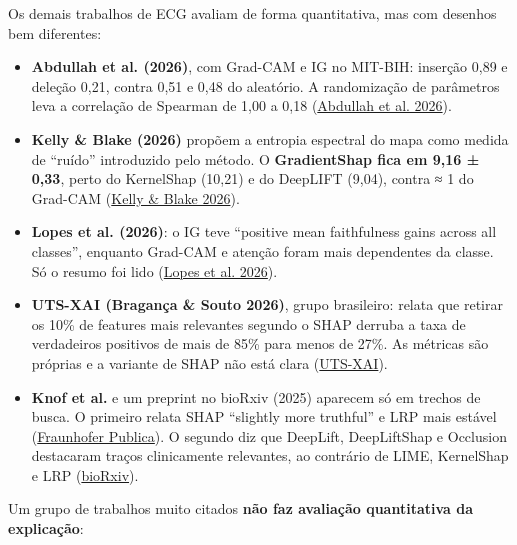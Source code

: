 \documentclass[11pt,a4paper]{article}
\begin{document}
Os demais trabalhos de ECG avaliam de forma quantitativa, mas com desenhos bem diferentes:

\begin{itemize}
\item \textbf{Abdullah et al. (2026)}, com Grad-CAM e IG no MIT-BIH: inserção 0,89 e deleção 0,21, contra 0,51 e 0,48 do aleatório. A randomização de parâmetros leva a correlação de Spearman de 1,00 a 0,18 (\href{https://pmc.ncbi.nlm.nih.gov/articles/PMC13296925/}{Abdullah et al. 2026}).
\item \textbf{Kelly \& Blake (2026)} propõem a entropia espectral do mapa como medida de ``ruído'' introduzido pelo método. O \textbf{GradientShap fica em 9,16 ± 0,33}, perto do KernelShap (10,21) e do DeepLIFT (9,04), contra ≈ 1 do Grad-CAM (\href{https://arxiv.org/html/2606.24974}{Kelly \& Blake 2026}).
\item \textbf{Lopes et al. (2026)}: o IG teve ``positive mean faithfulness gains across all classes'', enquanto Grad-CAM e atenção foram mais dependentes da classe. Só o resumo foi lido (\href{https://recima21.com.br/recima21/en/article/view/9152}{Lopes et al. 2026}).
\item \textbf{UTS-XAI (Bragança \& Souto 2026)}, grupo brasileiro: relata que retirar os 10\% de features mais relevantes segundo o SHAP derruba a taxa de verdadeiros positivos de mais de 85\% para menos de 27\%. As métricas são próprias e a variante de SHAP não está clara (\href{https://pmc.ncbi.nlm.nih.gov/articles/PMC13369486/}{UTS-XAI}).
\item \textbf{Knof et al.} e um preprint no bioRxiv (2025) aparecem só em trechos de busca. O primeiro relata SHAP ``slightly more truthful'' e LRP mais estável (\href{https://publica.fraunhofer.de/handle/publica/472815}{Fraunhofer Publica}). O segundo diz que DeepLift, DeepLiftShap e Occlusion destacaram traços clinicamente relevantes, ao contrário de LIME, KernelShap e LRP (\href{https://doi.org/10.1101/2025.02.14.638219}{bioRxiv}).
\end{itemize}

Um grupo de trabalhos muito citados \textbf{não faz avaliação quantitativa da explicação}:
\end{document}
